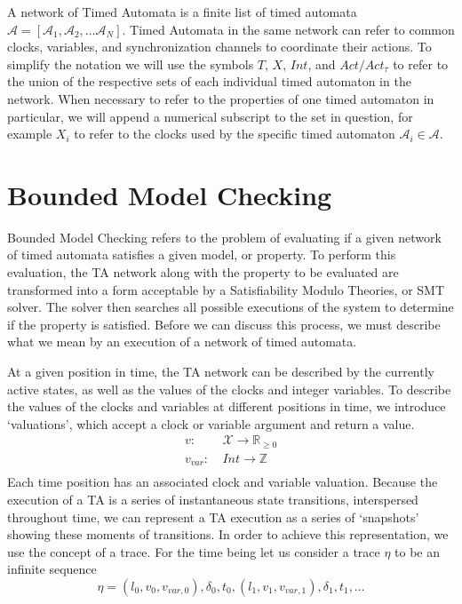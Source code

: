 \documentclass[a4paper,11pt]{report}
\theoremstyle{definition}
\begin{document}
A network of Timed Automata is a finite list of timed automata \(\mathcal{A} =
[\mathcal{A}_1, \mathcal{A}_2, \ldots \mathcal{A}_N]\). Timed Automata in the
same network can refer to common clocks, variables, and synchronization channels
to coordinate their actions. To simplify the notation we will use the symbols
\(T\), \(X\), \(Int\), and \(Act/Act_{\tau}\) to refer to the union of the respective
sets of each individual timed automaton in the network. When necessary to refer
to the properties of one timed automaton in particular, we will append a
numerical subscript to the set in question, for example \(X_i\) to refer to the
clocks used by the specific timed automaton \(\mathcal{A}_{i} \in \mathcal{A}\).

\section{Bounded Model Checking}\label{bounded-sat}

%

Bounded Model Checking\cite{bouyer09} refers to the problem of evaluating if a
given network of timed automata satisfies a given model, or property. To perform
this evaluation, the TA network along with the property to be evaluated are
transformed into a form acceptable by a Satisfiability Modulo Theories, or SMT
solver. The solver then searches all possible executions of the system to
determine if the property is satisfied. Before we can discuss this process, we
must describe what we mean by an execution of a network of timed automata.

At a given position in time, the TA network can be described by the currently
active states, as well as the values of the clocks and integer variables.
To describe the values of the clocks and variables at different positions in
time, we introduce `valuations', which accept a clock or variable argument and
return a value.
\begin{align*}
  v : &\ \mathcal{X} \rightarrow \mathbb{R}_{\geq 0} \\
  v_{var} : &\ Int \rightarrow \mathbb{Z} \\
\end{align*}
Each time position has an associated clock and variable valuation.
Because the execution of a TA is a series of instantaneous state transitions,
interspersed throughout time, we can represent a TA execution as a series of
`snapshots' showing these moments of transitions. In order to achieve this
representation, we use the concept of a trace.
 For the time being let us consider a trace $\eta$ to be an infinite sequence
  \[\eta = (l_{0},v_{0},v_{var,0}),\delta_{0},t_{0},(l_{1},v_{1},v_{var,1}),\delta_{1},t_{1}, \ldots\]
\end{document}
